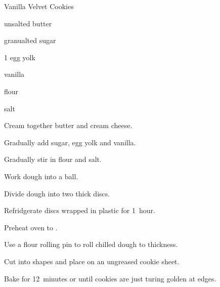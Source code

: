 \begin{recipe}{Vanilla Velvet Cookies}{}{}

\begin{ingredients}
\item {} unsalted butter
\item {} 
\item {} granualted sugar
\item 1 egg yolk
\item {} vanilla
\item \C{2 \half} flour
\item salt
\end{ingredients}

\begin{directions}
\item Cream together butter and cream cheese.
\item Gradually add sugar, egg yolk and vanilla.
\item Gradually stir in flour and salt.
\item Work dough into a ball.
\item Divide dough into two thick discs.
\item Refridgerate discs wrapped in plastic for 1~hour.
\item Preheat oven to .
\item Use a flour rolling pin to roll chilled dough to \cm{\half} thickness.
\item Cut into shapes and place on an ungreased cookie sheet.
\item Bake for 12~minutes or until cookies are just turing golden at edges.
\end{directions}

\end{recipe}
